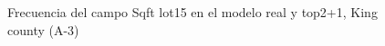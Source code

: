 \begin{figure}[H]
    \centering
    
    \caption{Frecuencia del campo Sqft lot15 en el modelo real y top2+1, King county (A-3)}
    \label{frecuency-top2+1-sqft lot15}
\end{figure}